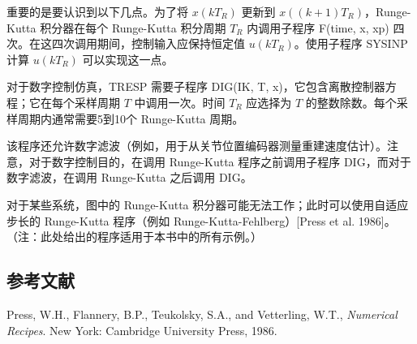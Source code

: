 \documentclass[UTF8]{ctexart}
\begin{document}
重要的是要认识到以下几点。为了将 $x(kT_R)$ 更新到 $x((k+1)T_R)$，Runge-Kutta 积分器在每个 Runge-Kutta 积分周期 $T_R$ 内调用子程序 F(time, x, xp) 四次。在这四次调用期间，控制输入应保持恒定值 $u(kT_R)$。使用子程序 SYSINP 计算 $u(kT_R)$ 可以实现这一点。

对于数字控制仿真，TRESP 需要子程序 DIG(IK, T, x)，它包含离散控制器方程；它在每个采样周期 $T$ 中调用一次。时间 $T_R$ 应选择为 $T$ 的整数除数。每个采样周期内通常需要5到10个 Runge-Kutta 周期。

该程序还允许数字滤波（例如，用于从关节位置编码器测量重建速度估计）。注意，对于数字控制目的，在调用 Runge-Kutta 程序之前调用子程序 DIG，而对于数字滤波，在调用 Runge-Kutta 之后调用 DIG。

对于某些系统，图中的 Runge-Kutta 积分器可能无法工作；此时可以使用自适应步长的 Runge-Kutta 程序（例如 Runge-Kutta-Fehlberg）[Press et al. 1986]。（注：此处给出的程序适用于本书中的所有示例。）

\vspace{1em}

\subsection*{参考文献}

\noindent [Press et al. 1986] Press, W.H., Flannery, B.P., Teukolsky, S.A., and Vetterling, W.T., \textit{Numerical Recipes}. New York: Cambridge University Press, 1986.

\ifstandalone
  
\end{document}
